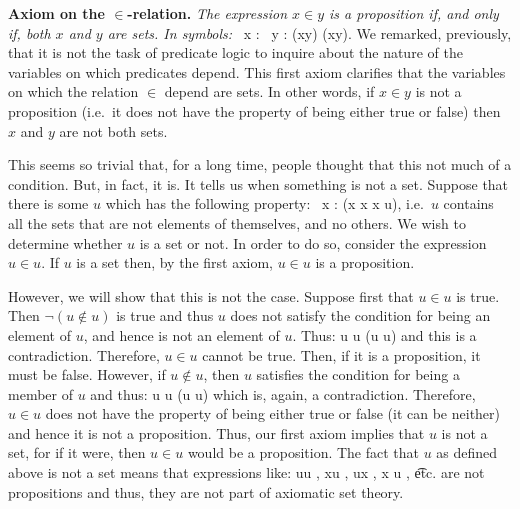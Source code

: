 \textbf{Axiom on the $\in$-relation.}\index{$\in$} \emph{The expression $x\in y$ is a proposition if, and only if, both $x$ and $y$ are sets. In symbols:}
\bse
\forall \, x : \forall \, y : (x\in y) \veebar \neg (x\in y).
\ese
We remarked, previously, that it is not the task of predicate logic to inquire about the nature of the variables on which predicates depend.
This first axiom clarifies that the variables on which the relation $\in$ depend are sets.
In other words, if $x\in y$ is not a proposition (i.e.\ it does not have the property of being either true or false) then $x$ and $y$ are not both sets.

This seems so trivial that, for a long time, people thought that this not much of a condition.
But, in fact, it is.
It tells us when something is not a set.
Suppose that there is some $u$ which has the following property:
\bse
\forall \, x : (x \notin x \eqv x \in u),
\ese
i.e.\ $u$ contains all the sets that are not elements of themselves, and no others.
We wish to determine whether $u$ is a set or not.
In order to do so, consider the expression $u\in u$.
If $u$ is a set then, by the first axiom, $u\in u$ is a proposition.

However, we will show that this is not the case.
Suppose first that $u\in u$ is true.
Then $\neg(u\notin u)$ is true and thus $u$ does not satisfy the condition for being an element of $u$, and hence is not an element of $u$.
Thus:
\bse
u \in u \imp \neg(u \in u)
\ese
and this is a contradiction.
Therefore, $u\in u$ cannot be true.
Then, if it is a proposition, it must be false.
However, if $u \notin u$, then $u$ satisfies the condition for being a member of $u$ and thus:
\bse
u \notin u \imp \neg(u \notin u)
\ese
which is, again, a contradiction.
Therefore, $u\in u$ does not have the property of being either true or false (it can be neither) and hence it is not a proposition.
Thus, our first axiom implies that $u$ is not a set, for if it were, then $u\in u$ would be a proposition.
\ee
\br
The fact that $u$ as defined above is not a set means that expressions like:
\bse
u\in u , \quad x\in u , \quad u\in x , \quad x \notin u , \quad \t{etc.}
\ese
are not propositions and thus, they are not part of axiomatic set theory.
\er

